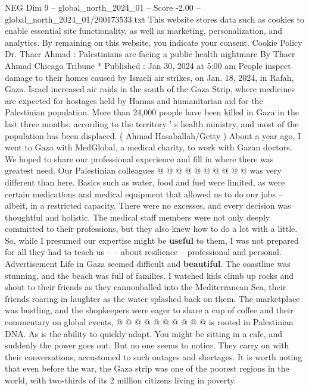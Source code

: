\begin{textsample}{NEG Dim 9 – global\_north\_2024\_01 – Score -2.00 – global\_north\_2024\_01/200173533.txt}  \label{ex:f9_neg_188}
This website stores data such as cookies to enable essential site functionality, as well as marketing, personalization, and analytics.
By remaining on this website, you indicate your consent.
Cookie Policy Dr.
Thaer Ahmad : Palestinians are facing a public health nightmare By Thaer Ahmad Chicago Tribune * Published : Jan 30, 2024 at 5:00 am People inspect damage to their homes caused by Israeli air strikes, on Jan. 18, 2024, in Rafah, Gaza.
Israel increased air raids in the south of the Gaza Strip, where medicines are expected for hostages held by Hamas and humanitarian aid for the Palestinian population.
More than 24,000 people have been killed in Gaza in the last three months, according to the territory ' s health ministry, and most of the population has been displaced. ( Ahmad Hasaballah/Getty ) About a year ago, I went to Gaza with MedGlobal, a medical charity, to work with Gazan doctors.
We hoped to share our professional experience and fill in where there was greatest need.
Our Palestinian colleagues @ @ @ @ @ @ @ @ @ @ was very different than here.
Basics such as water, food and fuel were limited, as were certain medications and medical equipment that allowed us to do our jobs -- albeit, in a restricted capacity.
There were no excesses, and every decision was thoughtful and holistic.
The medical staff members were not only deeply committed to their professions, but they also knew how to do a lot with a little.
So, while I presumed our expertise might be \textbf{useful} to them, I was not prepared for all they had to teach us -- -- about resilience -- professional and personal.
Advertisement Life in Gaza seemed difficult and \textbf{beautiful}.
The coastline was stunning, and the beach was full of families.
I watched kids climb up rocks and shout to their friends as they cannonballed into the Mediterranean Sea, their friends roaring in laughter as the water splashed back on them.
The marketplace was bustling, and the shopkeepers were eager to share a cup of coffee and their commentary on global events, @ @ @ @ @ @ @ @ @ @ is rooted in Palestinian DNA.
As is the ability to quickly adapt.
You might be sitting in a cafe, and suddenly the power goes out.
But no one seems to notice.
They carry on with their conversations, accustomed to such outages and shortages.
It is worth noting that even before the war, the Gaza strip was one of the poorest regions in the world, with two-thirds of its 2 million citizens living in poverty.

\end{textsample}
